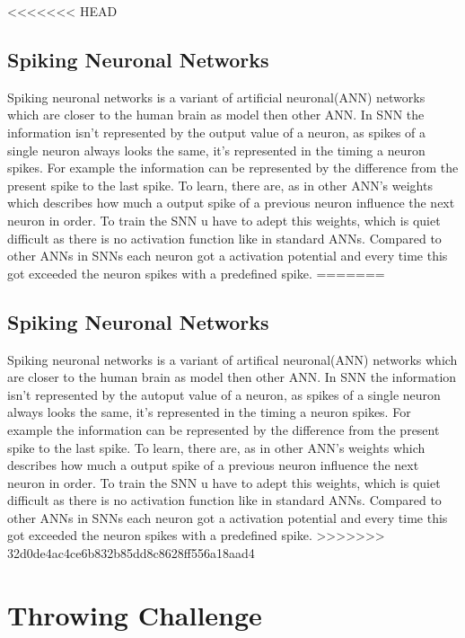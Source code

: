 <<<<<<< HEAD
\subsection{Spiking Neuronal Networks}
Spiking neuronal networks is a variant of artificial neuronal(ANN) networks which are closer to the human brain as model then other ANN. In SNN the information isn't represented by the output value of a neuron, as spikes of a single neuron always looks the same, it's represented in the timing a neuron spikes. For example the information can be represented by the difference from the present spike to the last spike. To learn, there are, as in other ANN's weights which describes how much a output spike of a previous neuron influence the next neuron in order. To train the SNN u have to adept this weights, which is quiet difficult as there is no activation function like in standard ANNs. Compared to other ANNs in SNNs each neuron got a activation potential and every time this got exceeded the neuron spikes with a predefined spike.
=======
\subsection{Spiking Neuronal Networks}%
Spiking neuronal networks is a variant of artifical neuronal(ANN) networks which are closer to the human brain as model then other ANN. In SNN the information isn't represented by the autoput value of a neuron, as spikes of a single neuron always looks the same, it's represented in the timing a neuron spikes. For example the information can be represented by the difference from the present spike to the last spike. To learn, there are, as in other ANN's weights which describes how much a output spike of a previous neuron influence the next neuron in order. To train the SNN u have to adept this weights, which is quiet difficult as there is no activation function like in standard ANNs. Compared to other ANNs in SNNs each neuron got a activation potential and every time this got exceeded the neuron spikes with a predefined spike.
>>>>>>> 32d0de4ac4ce6b832b85dd8c8628ff556a18aad4

\section{Throwing Challenge}
